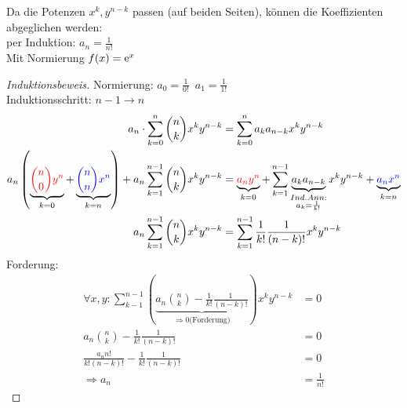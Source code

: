 Da die Potenzen $x^k, y^{n-k}$ passen (auf beiden Seiten), können die Koeffizienten abgeglichen werden:\\
per Induktion: $a_n = \frac{1}{n!}$\\
Mit Normierung $f(x) = \operatorname{e}^x$\\
\begin{proof}[Induktionsbeweis]
   Normierung: $a_0 = \frac{1}{0!}$\, $a_1=\frac{1}{1!}$\\
   Induktionsschritt: $n-1 \to n$
   \begin{align*} %
      a_n \cdot \sum_{k=0}^n {n \choose k} x^k y^{n-k} &= \sum_{k=0}^n a_k a_{n-k} x^k y^{n-k}\\
      a_n \left(\underbrace{\color{red}{n \choose 0} y^n}_{k=0} + \underbrace{\color{blue}{n \choose n} x^n}_{k=n} \right) + a_n \sum_{k=1}^{n-1} {n \choose k} x^k y^{n-k} &= \underbrace{\color{red}a_n y^n}_{k=0} + \sum_{k=1}^{n-1}\underbrace{a_k a_{n-k}}_{\substack{Ind.Ann:\\ a_k = \frac{1}{k!}}} x^k y^{n-k} + \underbrace{\color{blue}a_n x^n}_{k=n}\\
      a_n \sum_{k=1}^{n-1} {n \choose k} x^k y^{n-k} &= \sum_{k=1}^{n-1} \frac{1}{k!} \frac{1}{(n-k)!} x^k y^{n-k}
   \end{align*}
   Forderung:
   \begin{align*}
      \forall x,y: \sum_{k-1}^{n-1} \left(\underbrace{a_n {n \choose k} - \frac{1}{k!} \frac{1}{(n-k)!}}_{\Rightarrow 0 \text{(Forderung)}} \right)x^k y^{n-k} &= 0 \\
      a_n {n \choose k} - \frac{1}{k!} \frac{1}{(n-k)!} &= 0\\
      \frac{a_n n!}{k! (n-k)!} - \frac{1}{k!} \frac{1}{(n-k)!} &= 0\\
      \Rightarrow a_n &= \frac{1}{n!}
   \end{align*}
\end{proof}
